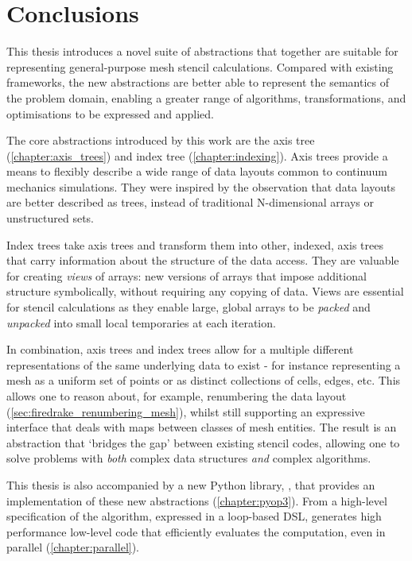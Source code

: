 \documentclass[thesis]{subfiles}
\begin{document}
\chapter{Conclusions}
\label{chapter:conclusions}

This thesis introduces a novel suite of abstractions that together are suitable for representing general-purpose mesh stencil calculations.
Compared with existing frameworks, the new abstractions are better able to represent the semantics of the problem domain, enabling a greater range of algorithms, transformations, and optimisations to be expressed and applied.

The core abstractions introduced by this work are the axis tree (\cref{chapter:axis_trees}) and index tree (\cref{chapter:indexing}).
Axis trees provide a means to flexibly describe a wide range of data layouts common to continuum mechanics simulations.
They were inspired by the observation that data layouts are better described as trees, instead of traditional N-dimensional arrays or unstructured sets.

Index trees take axis trees and transform them into other, indexed, axis trees that carry information about the structure of the data access.
They are valuable for creating \emph{views} of arrays: new versions of arrays that impose additional structure symbolically, without requiring any copying of data.
Views are essential for stencil calculations as they enable large, global arrays to be \emph{packed} and \emph{unpacked} into small local temporaries at each iteration.

In combination, axis trees and index trees allow for a multiple different representations of the same underlying data to exist - for instance representing a mesh as a uniform set of points or as distinct collections of cells, edges, etc.
This allows one to reason about, for example, renumbering the data layout (\cref{sec:firedrake_renumbering_mesh}), whilst still supporting an expressive interface that deals with maps between classes of mesh entities.
The result is an abstraction that `bridges the gap' between existing stencil codes, allowing one to solve problems with \emph{both} complex data structures \emph{and} complex algorithms.

This thesis is also accompanied by a new Python library, , that provides an implementation of these new abstractions (\cref{chapter:pyop3}).
From a high-level specification of the algorithm, expressed in a loop-based DSL,  generates high performance low-level code that efficiently evaluates the computation, even in parallel (\cref{chapter:parallel}).
\end{document}
